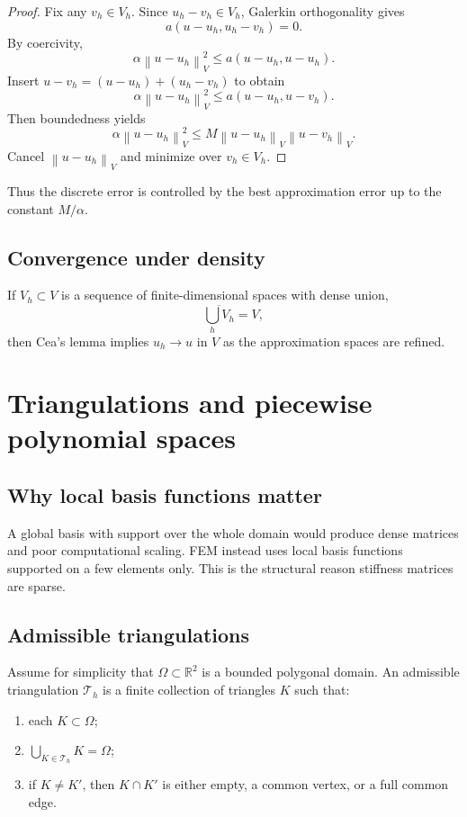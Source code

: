 \documentclass[11pt]{article}
\theoremstyle{definition}
\newcommand{\R}{\mathbb{R}}
\newcommand{\norm}[1]{\left\lVert #1\right\rVert}
\begin{document}
\begin{proof}
Fix any $v_h\in V_h$. Since $u_h-v_h\in V_h$, Galerkin orthogonality gives
\[
a(u-u_h,u_h-v_h)=0.
\]
By coercivity,
\[
\alpha\norm{u-u_h}_V^2 \le a(u-u_h,u-u_h).
\]
Insert $u-v_h=(u-u_h)+(u_h-v_h)$ to obtain
\[
\alpha\norm{u-u_h}_V^2
\le a(u-u_h,u-v_h).
\]
Then boundedness yields
\[
\alpha\norm{u-u_h}_V^2 \le M\norm{u-u_h}_V\norm{u-v_h}_V.
\]
Cancel $\norm{u-u_h}_V$ and minimize over $v_h\in V_h$.
\end{proof}

Thus the discrete error is controlled by the best approximation error up to the constant $M/\alpha$.

\subsection{Convergence under density}

If $V_h\subset V$ is a sequence of finite-dimensional spaces with dense union,
\[
\overline{\bigcup_h V_h}=V,
\]
then Cea's lemma implies $u_h\to u$ in $V$ as the approximation spaces are refined.

\section{Triangulations and piecewise polynomial spaces}

\subsection{Why local basis functions matter}

A global basis with support over the whole domain would produce dense matrices and poor computational scaling. FEM instead uses local basis functions supported on a few elements only. This is the structural reason stiffness matrices are sparse.

\subsection{Admissible triangulations}

Assume for simplicity that $\Omega\subset\R^2$ is a bounded polygonal domain. An admissible triangulation $\mathcal{T}_h$ is a finite collection of triangles $K$ such that:
\begin{enumerate}
    \item each $K\subset\Omega$;
    \item $\bigcup_{K\in\mathcal{T}_h} K = \Omega$;
    \item if $K\neq K'$, then $K\cap K'$ is either empty, a common vertex, or a full common edge.
\end{enumerate}
\end{document}

